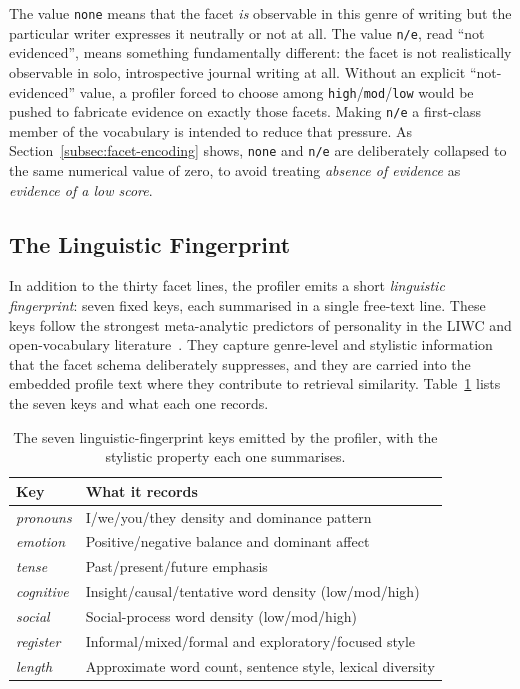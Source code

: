 \documentclass[../main.tex]{subfiles}
\begin{document}
The value \texttt{none} means that the facet \emph{is} observable in this genre
of writing but the particular writer expresses it neutrally or not at all. The
value \texttt{n/e}, read ``not evidenced'', means something fundamentally
different: the facet is not realistically observable in solo, introspective
journal writing at all. Without an explicit
``not-evidenced'' value, a profiler forced to choose among
\texttt{high}/\texttt{mod}/\texttt{low} would be pushed to fabricate evidence
on exactly those facets. Making \texttt{n/e} a first-class member of the
vocabulary is intended to reduce that pressure. As
Section~\ref{subsec:facet-encoding} shows, \texttt{none} and \texttt{n/e} are
deliberately collapsed to the same numerical value of zero, to avoid treating
\emph{absence of evidence} as \emph{evidence of a low score}.

\subsection{The Linguistic Fingerprint}
\label{subsec:linguistic}

In addition to the thirty facet lines, the profiler emits a short
\emph{linguistic fingerprint}: seven fixed keys, each summarised in a single
free-text line. These keys follow the strongest meta-analytic predictors of
personality in the LIWC and open-vocabulary
literature~\cite{Pennebaker2007TheDA}. They capture genre-level and stylistic
information that the facet schema deliberately suppresses, and they are carried
into the embedded profile text where they contribute to retrieval similarity.
Table~\ref{tab:linguistic-keys} lists the seven keys and what each one records.

\begin{table}[htbp]
  \centering
  \caption{The seven linguistic-fingerprint keys emitted by the profiler,
    with the stylistic property each one summarises.}
  \label{tab:linguistic-keys}
  \small
  \begin{tabular}{ll}
    \toprule
    \textbf{Key} & \textbf{What it records} \\
    \midrule
    \emph{pronouns}  & I/we/you/they density and dominance pattern \\
    \emph{emotion}   & Positive/negative balance and dominant affect \\
    \emph{tense}     & Past/present/future emphasis \\
    \emph{cognitive} & Insight/causal/tentative word density (low/mod/high) \\
    \emph{social}    & Social-process word density (low/mod/high) \\
    \emph{register}  & Informal/mixed/formal and exploratory/focused style \\
    \emph{length}    & Approximate word count, sentence style, lexical diversity \\
    \bottomrule
  \end{tabular}
\end{table}
\end{document}
